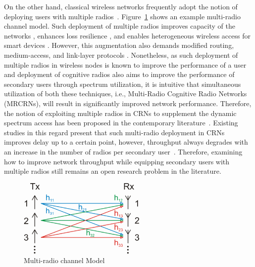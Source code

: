 
On the other hand, classical wireless networks frequently adopt the notion of deploying users with multiple radios~\cite{bahl2004reconsidering, adya2004multi}. Figure~\ref{fig:MIMO} shows an example multi-radio channel model. Such deployment of multiple radios improves capacity of the networks \cite{draves2004routing, bahl2004reconsidering}, enhances loss resilience \cite{miu2005improving}, and enables heterogeneous wireless access for smart devices \cite{song2012performance}. However, this augmentation also demands modified routing, medium-access, and link-layer protocols \cite{kyasanur2006routing, chatterjee2013low}. Nonetheless, as such deployment of multiple radios in wireless nodes is known to improve the performance of a user and  deployment of cognitive radios also aims to improve the performance of secondary users through spectrum utilization, it is intuitive that simultaneous utilization of both these techniques, i.e., Multi-Radio Cognitive Radio Networks (MRCRNs), will result in significantly improved network performance. Therefore, the notion of exploiting multiple radios in CRNs to supplement the dynamic spectrum access has been proposed in the contemporary literature~\cite{li2014deterministic, zhong2014capacity, khan2015towards}. Existing studies in this regard present that such multi-radio deployment in CRNs improves delay up to a certain point, however, throughput always degrades with an increase in the number of radios per secondary user~\cite{khan2015towards}. Therefore, examining how to improve network throughput while equipping secondary users with multiple radios still remains an open research problem in the literature.

\begin{figure}[!htbp]
    \begin{center}
        \includegraphics[width=0.55\textwidth]{myFigures/MIMO.png}
        \caption{Multi-radio channel Model~\cite{mimoWiki}}
        \label{fig:MIMO}
    \end{center}
\end{figure}

